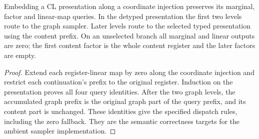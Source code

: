 \begin{lemma}
\label{lem:detype-queries}
\leanok
Embedding a CL presentation along a coordinate injection preserves its
marginal, factor and linear-map queries. In the detyped presentation the
first two levels route to the graph sampler. Later levels route to the
selected typed presentation using the content prefix. On an unselected
branch all marginal and linear outputs are zero; the first content factor
is the whole content register and the later factors are empty.
\end{lemma}
\begin{proof}
\leanok
Extend each register-linear map by zero along the coordinate injection and
restrict each continuation's prefix to the original register. Induction
on the presentation proves all four query identities. After the two graph
levels, the accumulated graph prefix is the original graph part of the
query prefix, and its content part is unchanged. These identities give the
specified dispatch rules, including the zero fallback. They are the
semantic correctness targets for the ambient sampler implementation.
\end{proof}

